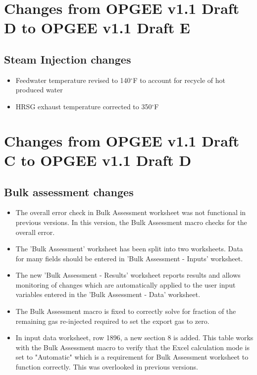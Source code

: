 \documentclass[11pt]{report}
\begin{document}
\section{Changes from OPGEE v1.1 Draft D to OPGEE v1.1 Draft E}
																					
\subsection{Steam Injection changes	}
	\begin{itemize}
	\item Feedwater temperature revised to 140$^\circ$F to account for recycle of hot produced water	
	\item HRSG exhaust temperature corrected to 350$^\circ$F																			
	\end{itemize}




\section{Changes from OPGEE v1.1 Draft C to OPGEE v1.1 Draft D}

\subsection{Bulk assessment changes }
\begin{itemize}
\item The overall error check in Bulk Assessment worksheet was not functional in previous versions. In this version, the Bulk Assessment macro checks for the overall error. 
\item The 'Bulk Assessment' worksheet has been split into two worksheets. Data for many fields should be entered in 'Bulk Assessment - Inputs' worksheet.
\item The new 'Bulk Assessment - Results' worksheet reports results and allows monitoring of changes which are automatically applied to the user input variables entered in the 'Bulk Assessment - Data' worksheet.
\item The Bulk Assessment macro is fixed to correctly solve for fraction of the remaining gas re-injected required to set the export gas to zero.
\item In input data worksheet, row 1896, a new section 8 is added. This table works with the Bulk Assessment macro to verify that the Excel calculation mode is set to "Automatic" which is a requirement for Bulk Assessment worksheet to function correctly. This was overlooked in previous versions.
\end{itemize}
\end{document}
